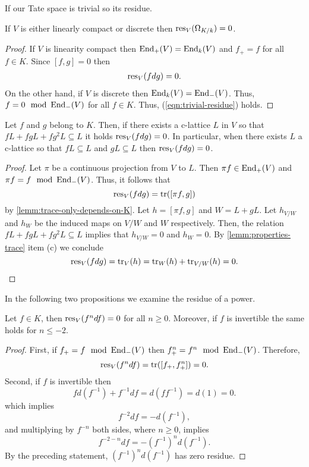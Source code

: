 If our Tate space is trivial so its residue.
\begin{proposition}\label{prop:residue-trivial-tate-space}
	If $V$ is either linearly compact or discrete then $\operatorname{res}_{V}(\Omega_{K/k}) = 0$.
\end{proposition}
\begin{proof}
	If $V$ is linearity compact then $\operatorname{End}_{+}(V) = \operatorname{End}_{k}(V)$ and $f_{+} = f$ for all $f \in K$. Since $[f,g] = 0$ then 
	\begin{align}\label{eqn:trivial-residue}
		\operatorname{res}_{V}(fdg) = 0.
	\end{align}
	On the other hand, if $V$ is discrete then $\operatorname{End}_{k}(V) = \operatorname{End}_{-}(V)$. Thus, $f = 0 \mod {\operatorname{End}}_{-}(V)$ for all $f \in K$. Thus, (\ref{eqn:trivial-residue}) holds.
\end{proof}
\begin{proposition}\label{prop:residue-and-continuity}
	Let $f$ and $g$ belong to $K$. Then, if there exists a c-lattice $L$ in $V$ so that $fL + fgL + fg^{2}L \subseteq L$ it holds $\operatorname{res}_{V}(fdg) = 0$. In particular, when there exists $L$ a c-lattice so that $fL \subseteq L$ and $gL \subseteq L$ then $\operatorname{res}_{V}(fdg) = 0$.
\end{proposition}
\begin{proof}
	Let $\pi$ be a continuous projection from $V$ to $L$. Then $\pi f \in \operatorname{End}_{+}(V)$ and $\pi f = f \mod {\operatorname{End}}_{-}(V)$. Thus, it follows that
	\[
		\operatorname{res}_{V}(fdg) = \operatorname{tr}([\pi f, g]) 
	\] 
	by \cref{lemm:trace-only-depends-on-K}. Let $h = [\pi f,g]$ and $W = L + gL$. Let $h_{V/W}$ and $h_{W}$ be the induced maps on $V/W$ and $W$ respectively. Then, the relation $fL + fgL + fg^{2}L \subseteq L$ implies that $h_{V/W} = 0$ and $h_{W} = 0$. By \cref{lemm:properties-trace} item (c) we conclude
	\[
		\operatorname{res}_{V}(fdg) = \operatorname{tr}_{V}(h) = \operatorname{tr}_{W}(h) + \operatorname{tr}_{V/W}(h) = 0.
	\]
\end{proof}
In the following two propositions we examine the residue of a power.
\begin{proposition}\label{prop:residue-of-a-power}
	Let $f \in K$, then $\operatorname{res}_{V}(f^{n}df) = 0$ for all $n \geq 0$. Moreover, if $f$ is invertible the same holds for $n \leq -2$.
\end{proposition}
\begin{proof}
	First, if $f_{+} = f \mod {\operatorname{End}}_{-}(V)$ then $f_{+}^{n} = f^{n} \mod {\operatorname{End}}_{-}(V)$. Therefore,
	\[
		\operatorname{res}_{V}(f^{n} df) = \operatorname{tr}([f_{+},f_{+}^{n}]) = 0.
	\]
	Second, if $f$ is invertible then
	\[
		fd(f^{-1}) + f^{-1}df = d(ff^{-1}) = d(1) = 0.
	\]
	which implies 
	\[
	f^{-2}df = -d(f^{-1}),
	\]
	and multiplying by $f^{-n}$ both sides, where $n\geq 0$, implies
	\[
	f^{-2-n}df = -(f^{-1})^{n}d(f^{-1}).
	\]
	By the preceding statement, $(f^{-1})^{n}d(f^{-1})$ has zero residue. 
\end{proof}
